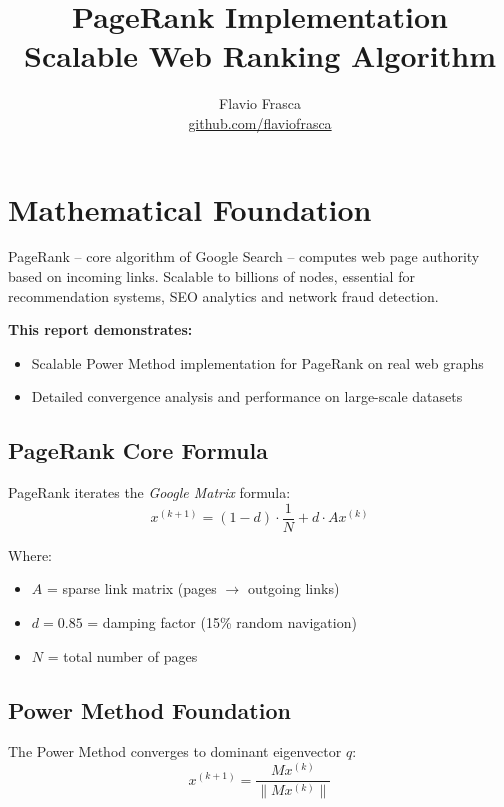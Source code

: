 \documentclass[11pt]{article}
\title{\textbf{PageRank Implementation}\\[0.3cm]
      \large Scalable Web Ranking Algorithm}
\author{Flavio Frasca \\ 
        \small \href{https://github.com/flaviofrasca}{github.com/flaviofrasca}}
\date{}  %
\begin{document}
\maketitle


    
\newpage
\tableofcontents


\newpage




\newpage
\section{Mathematical Foundation}

PageRank -- core algorithm of Google Search -- computes web page authority based on incoming links. 
Scalable to billions of nodes, essential for recommendation systems, SEO analytics and network fraud detection.

\noindent \textbf{This report demonstrates:}
\begin{itemize}
\item Scalable Power Method implementation for PageRank on real web graphs
\item Detailed convergence analysis and performance on large-scale datasets 
\end{itemize}

\subsection*{PageRank Core Formula}

PageRank iterates the \emph{Google Matrix} formula:
$$x^{(k+1)} = (1-d) \cdot \frac{1}{N} + d \cdot A x^{(k)}$$

Where:
\begin{itemize}
\item $A$ = sparse link matrix (pages $\rightarrow$ outgoing links)
\item $d = 0.85$ = damping factor (15\% random navigation)
\item $N$ = total number of pages
\end{itemize}

\subsection*{Power Method Foundation}

The Power Method converges to dominant eigenvector $q$:
$$x^{(k+1)} = \frac{M x^{(k)}}{\|M x^{(k)}\|}$$
\end{document}
